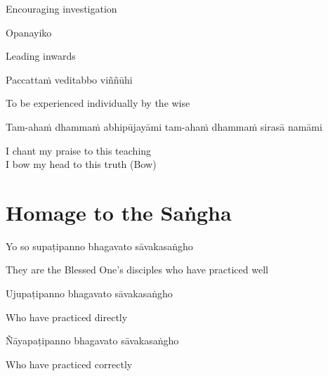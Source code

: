 \begin{english}
  Encouraging investigation
\end{english}

Opanayiko

\begin{english}
  Leading inwards
\end{english}

Paccattaṁ veditabbo viññūhi

\begin{english}
  To be experienced individually by the wise
\end{english}

\begin{pali-hang}
Tam-ahaṁ dhammaṁ abhipūjayāmi tam-ahaṁ dhammaṁ sirasā namāmi
\end{pali-hang}

\begin{english}
  I chant my praise to this teaching\\
  I bow my head to this truth \hfill{(Bow)}
\end{english}

\section{Homage to the Saṅgha}
\label{homage-sangha}

\begin{leader}
\end{leader}
\begin{leader}
\end{leader}

Yo so supaṭipanno bhagavato sāvakasaṅgho

\begin{english}
  They are the Blessed One’s disciples who have practiced well
\end{english}

Ujupaṭipanno bhagavato sāvakasaṅgho

\begin{english}
  Who have practiced directly
\end{english}

Ñāyapaṭipanno bhagavato sāvakasaṅgho

\begin{english}
  Who have practiced correctly
\end{english}

